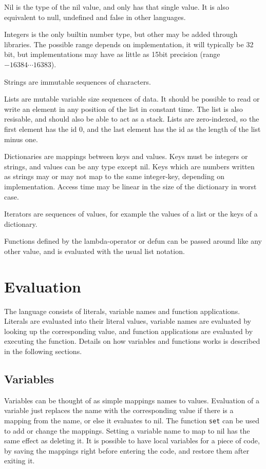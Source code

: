 Nil is the type of the nil value, and only has that single value. It is also equivalent to null, undefined and false in other languages.

Integers is the only builtin number type, but other may be added through libraries. The possible range depends on implementation, it will typically be 32 bit, but implementations may have as little as 15bit precision (range $-16384\cdots 16383$).

Strings are immutable sequences of characters.

Lists are mutable variable size sequences of data. It should be possible to read or write an element in any position of the list in constant time. The list is also resisable, and should also be able to act as a stack. 
Lists are zero-indexed, so the first element has the id 0, and the last element has the id as the length of the list minus one.

Dictionaries are mappings between keys and values. Keys must be integers or strings, and values can be any type except nil. Keys which are numbers written as strings may or may not map to the same integer-key, depending on implementation. Access time may be linear in the size of the dictionary in worst case.

Iterators are sequences of values, for example the values of a list or the keys of a dictionary. 

Functions defined by the lambda-operator or defun can be passed around like any other value, and is evaluated with the usual list notation.

\section{Evaluation}

The language consists of literals, variable names and function applications.
Literals are evaluated into their literal values, 
variable names are evaluated by looking up the corresponding value, and
function applications are evaluated by executing the function.
Details on how variables and functions works is described in the following sections.

\subsection{Variables}

Variables can be thought of as simple mappings names to values.
Evaluation of a variable just replaces the name with the corresponding value if there is a mapping from the name, or else it evaluates to nil.
The function \verb|set| can be used to add or change the mappings. Setting a variable name to map to nil has the same effect as deleting it.
It is possible to have local variables for a piece of code, by saving the mappings right before entering the code, and restore them after exiting it.

